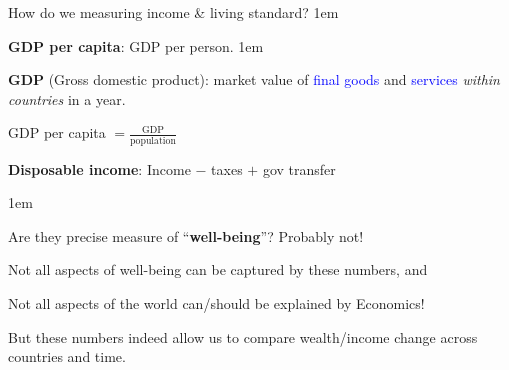 \documentclass[11pt,aspectratio=43,usenames,dvipsnames]{beamer}
\newcommand{\blue}[1]{\textcolor{blue}{#1}}
\let\olditemize=\itemize
\let\endolditemize=\enditemize
\renewenvironment{itemize}{\olditemize \itemsep1em}{\endolditemize}
\let\oldenumerate=\enumerate
\let\endoldenumerate=\endenumerate
\renewenvironment{enumerate}{\oldenumerate \itemsep1em}{ \endoldenumerate}
\theoremstyle{definition}
\begin{document}
\begin{frame}{How do we measuring income \& living standard?}
\label{slide:How_do_we_measuring_income____living_standard_}
    \begin{enumerate}
        \item \textbf{GDP per capita}: GDP per person.
        \begin{itemize}
            \item \textbf{GDP} (Gross domestic product): market value of \blue{final goods} and \blue{services} \textit{within countries} in a year.
            \item GDP per capita $ = \frac{\text{GDP}}{\text{population}} $
        \end{itemize}
        \item \textbf{Disposable income}: Income $ -  $ taxes $ + $ gov transfer
    \end{enumerate}

    \vspace{1em}

    \begin{itemize}
        \item Are they precise measure of ``\textbf{well-being}''? Probably not!
        \item Not all aspects of well-being can be captured by these numbers, and
        \item Not all aspects of the world can/should be explained by Economics!
        \item But these numbers indeed allow us to compare wealth/income change across countries and time.
    \end{itemize}

\end{frame}
\end{document}
